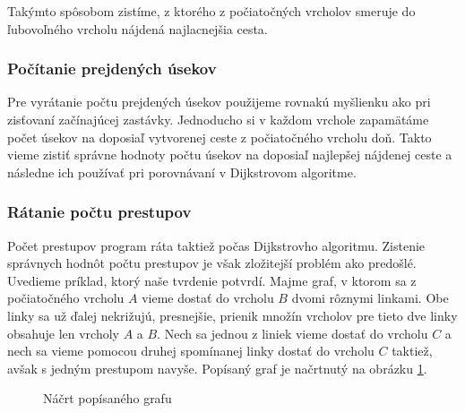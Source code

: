 Takýmto spôsobom zistíme, z ktorého z počiatočných vrcholov smeruje do ľubovoľného vrcholu nájdená najlacnejšia cesta.\newline


\subsubsection{Počítanie prejdených úsekov}

Pre vyrátanie počtu prejdených úsekov použijeme rovnakú myšlienku ako pri zisťovaní začínajúcej zastávky. Jednoducho si v každom vrchole zapamätáme počet úsekov na doposiaľ vytvorenej ceste z počiatočného vrcholu doň. Takto vieme zistiť správne hodnoty počtu úsekov na doposiaľ najlepšej nájdenej ceste a následne ich používať pri porovnávaní v Dijkstrovom algoritme.\newline


\subsubsection{Rátanie počtu prestupov}

Počet prestupov program ráta taktiež počas Dijkstrovho algoritmu. Zistenie správnych hodnôt počtu prestupov je však zložitejší problém ako predošlé. Uvedieme príklad, ktorý naše tvrdenie potvrdí. Majme graf, v ktorom sa z počiatočného vrcholu $A$ vieme dostať do vrcholu $B$ dvomi rôznymi linkami. Obe linky sa už ďalej nekrižujú, presnejšie, prienik množín vrcholov pre tieto dve linky obsahuje len vrcholy $A$ a $B$. Nech sa jednou z liniek vieme dostať do vrcholu $C$ a nech sa vieme pomocou druhej spomínanej linky dostať do vrcholu $C$ taktiež, avšak s jedným prestupom navyše. Popísaný graf je načrtnutý na obrázku \ref{Trans}.

\begin{figure}[H]
\caption{Náčrt popísaného grafu}
\label{Trans}
\end{figure}

